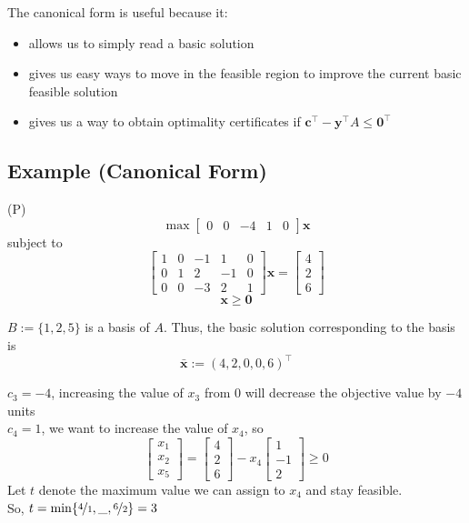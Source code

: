 The canonical form is useful because it:
\begin{itemize}
    \item allows us to simply read a basic solution
    \item gives us easy ways to move in the feasible region to improve the current basic
    feasible solution
    \item gives us a way to obtain optimality certificates if
    $\bm{c}^\top -\bm{y}^\top A\le \bm{0}^\top $
\end{itemize}

\subsection{Example (Canonical Form)}
(P)
\[\max \begin{bmatrix}
    0 & 0 & -4 & 1 & 0
\end{bmatrix}\bm{x}\]
subject to
\[
    \begin{bmatrix}
        1 & 0 & -1 & 1 & 0\\
        0 & 1 & 2 & -1 & 0\\
        0 & 0 & -3 & 2 & 1
    \end{bmatrix}\bm{x}
    =
    \begin{bmatrix}
        4\\
        2\\
        6
    \end{bmatrix} \]
\[ \bm{x}\ge \bm{0} \]

$B:=\{1,2,5\}$ is a basis of $A$. Thus, the basic solution corresponding to the
basis is
\[\bm{\bar{x}}:=(4,2,0,0,6)^\top\]

$c_3=-4$, increasing the value of $x_3$ from $0$ will decrease the objective value by $-4$ units\\
$c_4=1$, we want to increase the value of $x_4$, so
\[
    \begin{bmatrix}
        x_1\\
        x_2\\
        x_5
    \end{bmatrix}
    =
    \begin{bmatrix}
        4\\
        2\\
        6
    \end{bmatrix}
    -x_4
    \begin{bmatrix}
        1\\
        -1\\
        2
    \end{bmatrix}
    \ge 0
\]
Let $t$ denote the maximum value we can assign to $x_4$ and stay feasible.\\
So,
$t=\min\{\nicefrac{4}{1},\_,\nicefrac{6}{2}\}=3$